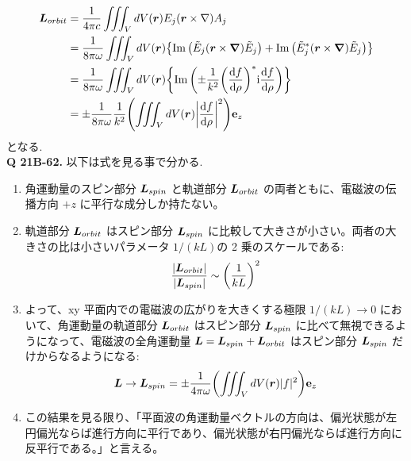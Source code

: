 \documentclass[uplatex,a4paper,dvipdfmx]{jsarticle}
\theoremstyle{definition}
\begin{document}
\begin{align}
  \LL_{orbit} & = \frac{1}{4\pi c}\iiint_VdV(\rr)E_j(\rr\times\nabla)A_j                                                                   \\
              & = \frac{1}{8\pi\omega}\iiint_VdV(\rr)\qty{\Im\qty(\Et_j(\rr\times\vnabla)\Et_j) + \Im\qty(\Et_j^*(\rr\times\vnabla)\Et_j)} \\
              & = \frac{1}{8\pi\omega}\iiint_VdV(\rr)\qty{\Im\qty(\pm\frac{1}{k^2}\qty(\dv{f}{\rho})^*\ii\dv{f}{\rho})}                    \\
              & = \pm\frac{1}{8\pi\omega}\frac{1}{k^2}\qty(\iiint_VdV(\rr)\qty|\dv{f}{\rho}|^2)\vb{e}_z
\end{align}
となる. \\

\textbf{Q 21B-62.}
以下は式を見る事で分かる.
\begin{enumerate}
  \item 角運動量のスピン部分 $\vb*{L}_{spin}$ と軌道部分 $\vb*{L}_{orbit}$ の両者ともに、電磁波の伝播方向 $+z$ に平行な成分しか持たない。
  \item 軌道部分 $\vb*{L}_{orbit}$ はスピン部分 $\vb*{L}_{spin}$ に比較して大きさが小さい。両者の大きさの比は小さいパラメータ $1/(kL)$の 2 乗のスケールである:
        \begin{align}
          \frac{|\vb*{L}_{orbit}|}{|\vb*{L}_{spin}|} \sim \qty(\frac{1}{kL})^2
        \end{align}
  \item よって、xy 平面内での電磁波の広がりを大きくする極限 $1/(kL) \to 0$ において、角運動量の軌道部分 $\vb*{L}_{orbit}$ はスピン部分 $\vb*{L}_{spin}$ に比べて無視できるようになって、電磁波の全角運動量 $\vb*{L} = \vb*{L}_{spin} + \vb*{L}_{orbit}$ はスピン部分 $\vb*{L}_{spin}$ だけからなるようになる:
        \begin{align}
          \vb*{L} \to \vb*{L}_{spin} = \pm \frac{1}{4\pi\omega}\qty(\iiint_VdV(\vb*{r})|f|^2)\vb{e}_z \label{L limit}
        \end{align}
  \item この結果を見る限り、「平面波の角運動量ベクトルの方向は、偏光状態が左円偏光ならば進行方向に平行であり、偏光状態が右円偏光ならば進行方向に反平行である。」と言える。
\end{enumerate}
\end{document}
